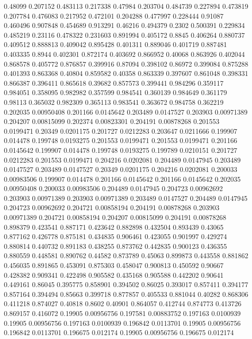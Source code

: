 0.48099 0.207152
0.483113 0.217338
0.47984 0.203704
0.484739 0.227894
0.473819 0.207784
0.476083 0.217952
0.472101 0.204288
0.477997 0.228444
0.91087 0.460496
0.907848 0.454689
0.913291 0.46216
0.494379 0.2302
0.500391 0.229834
0.485219 0.23116
0.478322 0.231603
0.891994 0.405172
0.8845 0.406264
0.880737 0.409512
0.888813 0.409042
0.895428 0.401311
0.889046 0.401719
0.887481 0.403335
0.8944 0.402301
0.872174 0.403692
0.866952 0.40068
0.863926 0.402044
0.868578 0.405772
0.876857 0.399916
0.87094 0.398102
0.86972 0.399084
0.875288 0.401393
0.863368 0.40804
0.859582 0.40358
0.863339 0.397607
0.861048 0.398331
0.866387 0.396411
0.865618 0.39682
0.857573 0.399441
0.984296 0.359117
0.984051 0.358095
0.982982 0.357599
0.984541 0.360139
0.984649 0.361179
0.98113 0.365032
0.982309 0.365113
0.983541 0.363672
0.984758 0.362219
0.202035 0.00950408
0.201166 0.0145642
0.203489 0.0147527
0.203903 0.00971389
0.204207 0.00815099
0.202374 0.00823301
0.204191 0.00878268
0.201553 0.0199471
0.20349 0.0201175
0.201727 0.0212283
0.203647 0.0211666
0.199907 0.014478
0.199748 0.0193275
0.201553 0.0199471
0.201553 0.0199471
0.201166 0.0145642
0.199907 0.014478
0.199748 0.0193275
0.199789 0.0210151
0.201727 0.0212283
0.201553 0.0199471
0.204216 0.0202081
0.204489 0.0147945
0.203489 0.0147527
0.203489 0.0147527
0.20349 0.0201175
0.204216 0.0202081
0.200033 0.00983506
0.199907 0.014478
0.201166 0.0145642
0.201166 0.0145642
0.202035 0.00950408
0.200033 0.00983506
0.204489 0.0147945
0.204723 0.00962692
0.203903 0.00971389
0.203903 0.00971389
0.203489 0.0147527
0.204489 0.0147945
0.204723 0.00962692
0.204721 0.00858194
0.204191 0.00878268
0.203903 0.00971389
0.204721 0.00858194
0.204207 0.00815099
0.204191 0.00878268
0.898379 0.423541
0.887171 0.423642
0.882898 0.432504
0.893439 0.43065
0.877162 0.426778
0.875181 0.434835
0.906461 0.423055
0.901997 0.429274
0.880814 0.440732
0.891183 0.438255
0.873762 0.442835
0.900123 0.436355
0.880559 0.448581
0.890762 0.44582
0.873789 0.45063
0.899873 0.443558
0.881862 0.456035
0.891865 0.453091
0.875303 0.458047
0.900813 0.450592
0.90667 0.428382
0.909341 0.422498
0.905582 0.435168
0.905588 0.442202
0.90641 0.449161
0.86045 0.395775
0.858901 0.394502
0.86025 0.393017
0.857411 0.394177
0.857164 0.394494
0.85663 0.399718
0.877857 0.405533
0.881044 0.40282
0.868306 0.411218
0.874027 0.40818
0.8602 0.40901
0.864057 0.412744
0.874773 0.413726
0.869157 0.416072
0.19905 0.00956756
0.197581 0.00883752
0.197163 0.0100939
0.19905 0.00956756
0.197163 0.0100939
0.196842 0.0113701
0.19905 0.00956756
0.196842 0.0113701
0.196675 0.012174
0.19905 0.00956756
0.196675 0.012174
